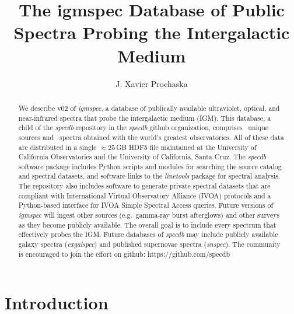 \documentclass[12pt]{elsarticle}
\begin{document}
\begin{frontmatter}

\title{The igmspec Database of Public Spectra Probing
the Intergalactic Medium}


\author{
J. Xavier Prochaska}%
\address{
Department of Astronomy and Astrophysics, UCO/Lick Observatory, University of California, 1156 High Street, Santa Cruz, CA 95064}

\begin{abstract}
We describe v02 of {\it igmspec}, a database of publically
available ultraviolet, optical, and near-infrared spectra 
that probe the intergalactic medium (IGM).  This database, a child
of the {\it specdb} repository in the {\it specdb} github organization, 
comprises \nsource~unique
sources and \nspectra~spectra obtained with the world's greatest
observatories.  All of these data are distributed in a single
$\approx 25$\,GB HDF5 file maintained at the University of
California Observatories and the University of California,
Santa Cruz.  The {\it specdb} software package includes
Python scripts and modules for searching the source catalog
and spectral datasets, and software links to the {\it linetools}
package for spectral analysis.
The repository also includes software to generate 
private spectral datasets that are compliant 
with International Virtual Observatory Alliance (IVOA) protocols
and a Python-based interface for IVOA Simple Spectral Access
queries.
Future versions of {\it igmspec} will ingest other sources
(e.g.\ gamma-ray burst afterglows) and other surveys as they become
publicly available.  
The overall goal is to include every 
spectrum that effectively probes the IGM.  
Future databases of {\it specdb}
may include 
publicly available galaxy spectra 
({\it exgalspec}) and 
published supernovae spectra ({\it snspec}). 
The community is encouraged to join the effort on github:
https://github.com/specdb
\end{abstract}

\end{frontmatter}


\section{Introduction}
\label{sec:intro}
\end{document}

